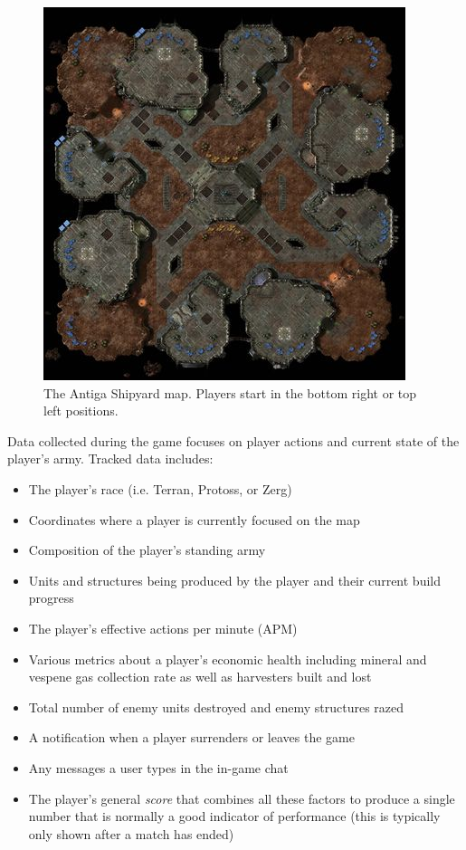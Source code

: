 \documentclass{nime-document-class}
\begin{document}
\begin{figure}[htbp]
	\centering
		\includegraphics[width=1\columnwidth]{antiga-shipyard.jpeg}
	\caption{The Antiga Shipyard map. Players start in the bottom right or top left positions.}
	\label{fig:AntigaShipyardFigure}
\end{figure}

Data collected during the game focuses on player actions and current state of the player's army.
Tracked data includes:
\begin{itemize} \itemsep2pt \parskip0pt 
  \item The player's race (i.e. Terran, Protoss, or Zerg)
  \item Coordinates where a player is currently focused on the map
  \item Composition of the player's standing army
  \item Units and structures being produced by the player and their current build progress
  \item The player's effective actions per minute (APM)
  \item Various metrics about a player's economic health including mineral and vespene gas collection rate as well as harvesters built and lost
  \item Total number of enemy units destroyed and enemy structures razed
  \item A notification when a player surrenders or leaves the game
  \item Any messages a user types in the in-game chat
  \item The player's general {\em score} that combines all these factors to produce a single number that is normally a good indicator of performance (this is typically only shown after a match has ended)
\end{itemize}
\end{document}
